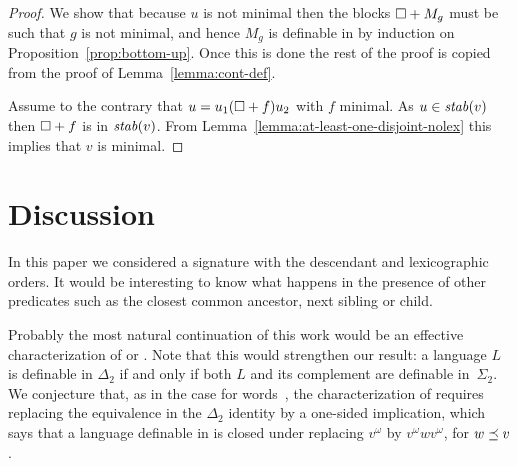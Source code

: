 \documentclass{LMCS}
\begin{document}
{\begin{proof}
  We show that because $u$ is not minimal then the blocks $\Box + M_g$ must be
  such that $g$ is not minimal, and hence $M_g$ is definable in \Stwo by
  induction on Proposition~\ref{prop:bottom-up}. Once this is done the rest of
  the proof is copied from the proof of Lemma~\ref{lemma:cont-def}.

  Assume to the contrary that $u=u_1(\Box + f)u_2$ with $f$ minimal. As $u \in
  \mathit{stab}(v)$ then $\Box +f$ is in $\mathit{stab}(v)$. From
  Lemma~\ref{lemma:at-least-one-disjoint-nolex} this implies that $v$ is
  minimal.
\end{proof}
}

\section{Discussion}
\label{sec:conclusion}
In this paper we considered a signature with the descendant and
lexicographic orders. It would be interesting to know what happens in
the presence of other predicates such as the closest common ancestor,
next sibling or child.

Probably the most natural continuation of this work would be an
effective characterization of \Stwo or \Stwol. Note that this would
strengthen our result: a language $L$ is definable in $\Delta_2$ if
and only if both $L$ and its complement are definable
in~$\Sigma_2$. We conjecture that, as in the case for
words~\cite{arfi91}, the characterization of \Stwol requires replacing
the equivalence in the $\Delta_2$ identity by a one-sided implication,
which says that a language definable in \Stwol is closed under
replacing $v^\omega$ by $v^\omega w v^\omega$, for $w \preceq v$.
\end{document}
